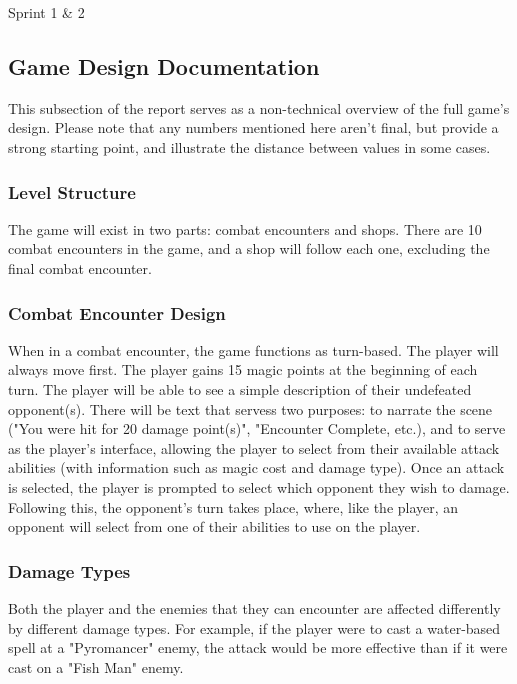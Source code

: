 Sprint 1 \& 2
\subsection{Game Design Documentation}

This subsection of the report serves as a non-technical overview of the full game's design. Please note that any numbers mentioned here aren't final, but provide a strong starting point, and illustrate the distance between values in some cases.

\subsubsection{Level Structure}

The game will exist in two parts: combat encounters and shops. There are 10 combat encounters in the game, and a shop will follow each one, excluding the final combat encounter.

\subsubsection{Combat Encounter Design}

When in a combat encounter, the game functions as turn-based. The player will always move first. The player gains 15 magic points at the beginning of each turn. The player will be able to see a simple description of their undefeated opponent(s). There will be text that servess two purposes: to narrate the scene ("You were hit for 20 damage point(s)", "Encounter Complete, etc.), and to serve as the player's interface, allowing the player to select from their available attack abilities (with information such as magic cost and damage type). Once an attack is selected, the player is prompted to select which opponent they wish to damage. Following this, the opponent's turn takes place, where, like the player, an opponent will select from one of their abilities to use on the player.

\subsubsection{Damage Types}

Both the player and the enemies that they can encounter are affected differently by different damage types. For example, if the player were to cast a water-based spell at a "Pyromancer" enemy, the attack would be more effective than if it were cast on a "Fish Man" enemy.

